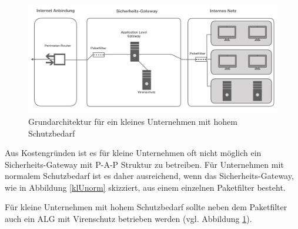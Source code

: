 \begin{figure}
	\includegraphics[width= \linewidth]{klUnternehmnorm}
	\caption{Grundarchitektur für ein kleines Unternehmen mit hohem Schutzbedarf}
	\label{klUhoch}
\end{figure}

Aus Kostengründen ist es für kleine Unternehmen oft nicht möglich ein Sicherheits-Gateway mit P-A-P Struktur zu betreiben. Für Unternehmen mit normalem Schutzbedarf ist es daher ausreichend, wenn das Sicherheits-Gateway, wie in Abbildung \ref{klUnorm} skizziert, aus einem einzelnen Paketfilter besteht. 

Für kleine Unternehmen mit hohem Schutzbedarf sollte neben dem Paketfilter auch ein ALG mit Virenschutz betrieben werden (vgl. Abbildung \ref{klUhoch}). 



